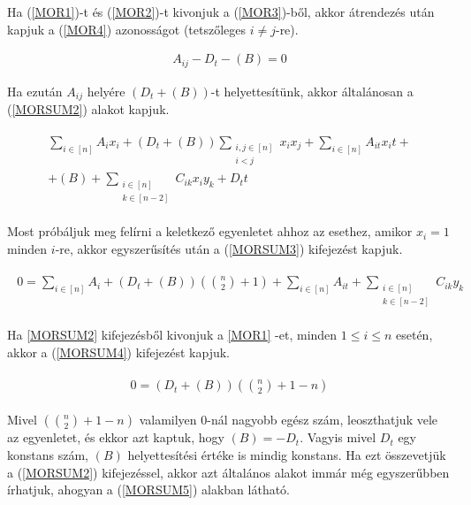 \begin{theorem}
	Ha (\ref{MOR1})-t és (\ref{MOR2})-t kivonjuk a (\ref{MOR3})-ből, akkor átrendezés után kapjuk a (\ref{MOR4}) azonosságot (tetszőleges $i \neq j$-re).
	
	\begin{align}
		A_{ij}-D_t-(B)=0 \label{MOR4}
	\end{align}

	Ha ezután $A_{ij}$ helyére $(D_t+(B))$-t helyettesítünk, akkor általánosan a (\ref{MORSUM2}) alakot kapjuk. 
	
	\begin{align} \label{MORSUM2}		
		\begin{split}		
			\sum_{i \in \left[ n \right] }{A_{i}x_i} + (D_t+(B))\sum_{\substack{ i,j \in [n] \\  i < j} }{x_i x_j} + \sum_{i \in \left[ n \right] }{A_{it}x_it} +
			\\
			+(B)+\sum_{\substack{ i \in [n] \\  k \in [n-2]} }{C_{ik}x_i y_k} + D_tt
		\end{split}
	\end{align}
	
	Most próbáljuk meg felírni a keletkező egyenletet ahhoz az esethez, amikor $x_i=1$ minden $i$-re, akkor egyszerűsítés után a (\ref{MORSUM3}) kifejezést kapjuk.
	
	\begin{align} \label{MORSUM3}		
	\begin{split}		
	0=\sum_{i \in \left[ n \right] }{A_{i}} + (D_t+(B))\left( \binom{n}{2}+1 \right)  + \sum_{i \in \left[ n \right] }{A_{it}}
	+ \sum_{\substack{ i \in [n] \\  k \in [n-2]} }{C_{ik}y_k}
	\end{split}
	\end{align}

	Ha \ref{MORSUM2} kifejezésből kivonjuk a \ref{MOR1} -et, minden $1 \leq i \leq n$  esetén, akkor a (\ref{MORSUM4}) kifejezést kapjuk.
	
	\begin{align} \label{MORSUM4}		
	\begin{split}		
	0=(D_t+(B))\left(\binom{n}{2}+1-n\right)
	\end{split}
	\end{align}

	Mivel $\left(\binom{n}{2}+1-n\right)$ valamilyen 0-nál nagyobb egész szám, leoszthatjuk vele az egyenletet, és ekkor azt kaptuk, hogy $(B)=-D_t$. Vagyis mivel $D_t$ egy konstans szám, $(B)$ helyettesítési értéke is mindig konstans. Ha ezt összevetjük a (\ref{MORSUM2}) kifejezéssel, akkor azt általános alakot immár még egyszerűbben írhatjuk, ahogyan a (\ref{MORSUM5}) alakban látható.
	

\end{theorem}
